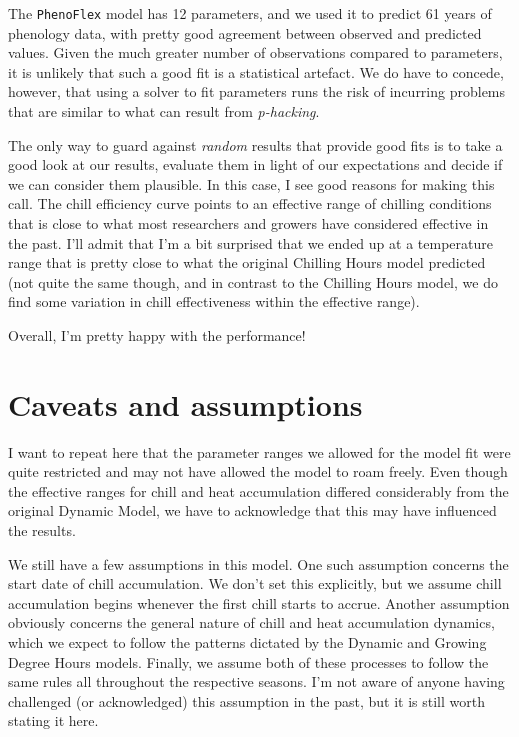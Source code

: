 \documentclass[
]{book}
\begin{document}
The \texttt{PhenoFlex} model has 12 parameters, and we used it to predict 61 years of phenology data, with pretty good agreement between observed and predicted values. Given the much greater number of observations compared to parameters, it is unlikely that such a good fit is a statistical artefact. We do have to concede, however, that using a solver to fit parameters runs the risk of incurring problems that are similar to what can result from \emph{p-hacking}.

The only way to guard against \emph{random} results that provide good fits is to take a good look at our results, evaluate them in light of our expectations and decide if we can consider them plausible. In this case, I see good reasons for making this call. The chill efficiency curve points to an effective range of chilling conditions that is close to what most researchers and growers have considered effective in the past. I'll admit that I'm a bit surprised that we ended up at a temperature range that is pretty close to what the original Chilling Hours model predicted (not quite the same though, and in contrast to the Chilling Hours model, we do find some variation in chill effectiveness within the effective range).

Overall, I'm pretty happy with the performance!

\hypertarget{caveats-and-assumptions}{%
\section{Caveats and assumptions}\label{caveats-and-assumptions}}

I want to repeat here that the parameter ranges we allowed for the model fit were quite restricted and may not have allowed the model to roam freely. Even though the effective ranges for chill and heat accumulation differed considerably from the original Dynamic Model, we have to acknowledge that this may have influenced the results.

We still have a few assumptions in this model. One such assumption concerns the start date of chill accumulation. We don't set this explicitly, but we assume chill accumulation begins whenever the first chill starts to accrue. Another assumption obviously concerns the general nature of chill and heat accumulation dynamics, which we expect to follow the patterns dictated by the Dynamic and Growing Degree Hours models. Finally, we assume both of these processes to follow the same rules all throughout the respective seasons. I'm not aware of anyone having challenged (or acknowledged) this assumption in the past, but it is still worth stating it here.
\end{document}
